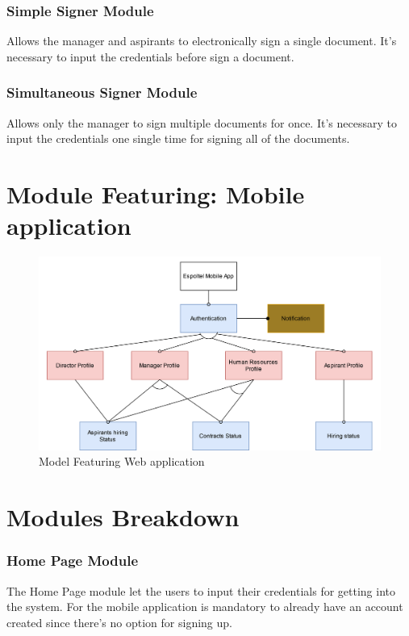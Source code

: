 \documentclass{scrreprt}
\begin{document}
\subsubsection{Simple Signer Module}
Allows the manager and aspirants to electronically sign a single document. It's necessary to input the credentials before sign a document.
\subsubsection{Simultaneous Signer Module}
Allows only the manager to sign multiple documents for once. It's necessary to input the credentials one single time for signing all of the documents.
\section{Module Featuring: Mobile application}



\begin{figure}
    \centering \small
    \includegraphics[width=\textwidth]{ModuleFeaturingMobile.png}
    \caption{Model Featuring Web application}
    \label{fig:module_featuring_mobile}
\end{figure}



\FloatBarrier 

\section{Modules Breakdown}
\setcounter{secnumdepth}{3}
\renewcommand\thesubsubsection{\thesection.\arabic{subsubsection}}


\subsubsection {Home Page Module}
The Home Page module let the users to input their credentials for getting into the system. For the mobile application is mandatory to already have an account created since there's no option for signing up.
\end{document}
